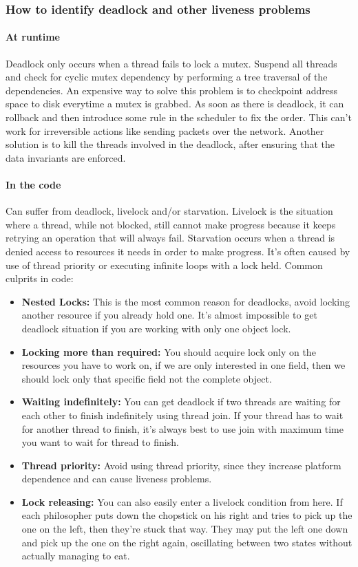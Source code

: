\documentclass{article}
\begin{document}
\subsubsection{How to identify deadlock and other liveness problems}
\paragraph{At runtime}
Deadlock only occurs when a thread fails to lock a mutex. Suspend all threads and check for cyclic mutex dependency by performing a tree traversal of the dependencies. An expensive way to solve this problem is to checkpoint address space to disk everytime a mutex is grabbed. As soon as there is deadlock, it can rollback and then introduce some rule in the scheduler to fix the order. This can't work for irreversible actions like sending packets over the network. Another solution is to kill the threads involved in the deadlock, after ensuring that the data invariants are enforced.

\paragraph{In the code}
Can suffer from deadlock, livelock and/or starvation. Livelock is the situation where a thread, while not blocked, still cannot make progress because it keeps retrying an operation that will always fail. Starvation occurs when a thread is denied access to resources it needs in order to make progress. It's often caused by use of thread priority or executing infinite loops with a lock held. Common culprits in code:
\begin{itemize}
    \item \textbf{Nested Locks:} This is the most common reason for deadlocks, avoid locking another resource if you already hold one. It’s almost impossible to get deadlock situation if you are working with only one object lock.
    \item \textbf{Locking more than required:} You should acquire lock only on the resources you have to work on, if we are only interested in one field, then we should lock only that specific field not the complete object.
    \item \textbf{Waiting indefinitely:} You can get deadlock if two threads are waiting for each other to finish indefinitely using thread join. If your thread has to wait for another thread to finish, it's always best to use join with maximum time you want to wait for thread to finish.
    \item \textbf{Thread priority:} Avoid using thread priority, since they increase platform dependence and can cause liveness problems.
    \item \textbf{Lock releasing:} You can also easily enter a livelock condition from here. If each philosopher puts down the chopstick on his right and tries to pick up the one on the left, then they're stuck that way. They may put the left one down and pick up the one on the right again, oscillating between two states without actually managing to eat.
\end{itemize}
\end{document}
